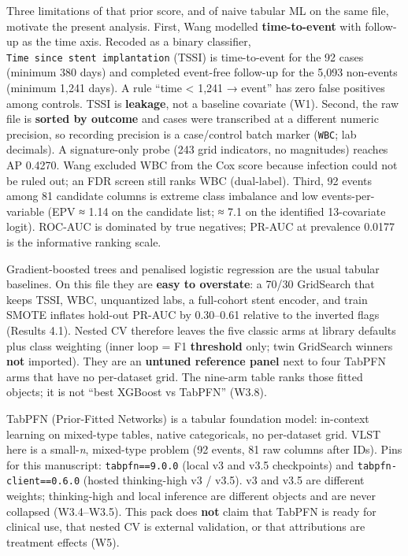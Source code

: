 \documentclass[
]{article}
\begin{document}
Three limitations of that prior score, and of naive tabular ML on the
same file, motivate the present analysis. First, Wang modelled
\textbf{time-to-event} with follow-up as the time axis. Recoded as a
binary classifier, \texttt{Time\ since\ stent\ implantation} (TSSI) is
time-to-event for the 92 cases (minimum 380 days) and completed
event-free follow-up for the 5,093 non-events (minimum 1,241 days). A
rule ``time \textless{} 1,241 → event'' has zero false positives among
controls. TSSI is \textbf{leakage}, not a baseline covariate (W1).
Second, the raw file is \textbf{sorted by outcome} and cases were
transcribed at a different numeric precision, so recording precision is
a case/control batch marker (\texttt{WBC}; lab decimals). A
signature-only probe (243 grid indicators, no magnitudes) reaches AP
0.4270. Wang excluded WBC from the Cox score because infection could not
be ruled out; an FDR screen still ranks WBC (dual-label). Third, 92
events among 81 candidate columns is extreme class imbalance and low
events-per-variable (EPV ≈ 1.14 on the candidate list; ≈ 7.1 on the
identified 13-covariate logit). ROC-AUC is dominated by true negatives;
PR-AUC at prevalence 0.0177 is the informative ranking scale.

Gradient-boosted trees and penalised logistic regression are the usual
tabular baselines. On this file they are \textbf{easy to overstate}: a
70/30 GridSearch that keeps TSSI, WBC, unquantized labs, a full-cohort
stent encoder, and train SMOTE inflates hold-out PR-AUC by 0.30--0.61
relative to the inverted flags (Results 4.1). Nested CV therefore leaves
the five classic arms at library defaults plus class weighting (inner
loop = F1 \textbf{threshold} only; twin GridSearch winners \textbf{not}
imported). They are an \textbf{untuned reference panel} next to four
TabPFN arms that have no per-dataset grid. The nine-arm table ranks
those fitted objects; it is not ``best XGBoost vs TabPFN'' (W3.8).

TabPFN (Prior-Fitted Networks) is a tabular foundation model: in-context
learning on mixed-type tables, native categoricals, no per-dataset grid.
VLST here is a small-\emph{n}, mixed-type problem (92 events, 81 raw
columns after IDs). Pins for this manuscript: \texttt{tabpfn==9.0.0}
(local v3 and v3.5 checkpoints) and \texttt{tabpfn-client==0.6.0}
(hosted thinking-high v3 / v3.5). v3 and v3.5 are different weights;
thinking-high and local inference are different objects and are never
collapsed (W3.4--W3.5). This pack does \textbf{not} claim that TabPFN is
ready for clinical use, that nested CV is external validation, or that
attributions are treatment effects (W5).
\end{document}
